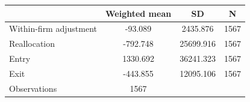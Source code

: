 {
\def\sym#1{\ifmmode^{#1}\else\(^{#1}\)\fi}
\begin{tabular}{l*{1}{ccc}}
\toprule
                    &Weighted mean&          SD&           N\\
\midrule
Within-firm adjustment&     -93.089&    2435.876&        1567\\
Reallocation        &    -792.748&   25699.916&        1567\\
Entry               &    1330.692&   36241.323&        1567\\
Exit                &    -443.855&   12095.106&        1567\\
\midrule
Observations        &        1567&            &            \\
\bottomrule
\end{tabular}
}
